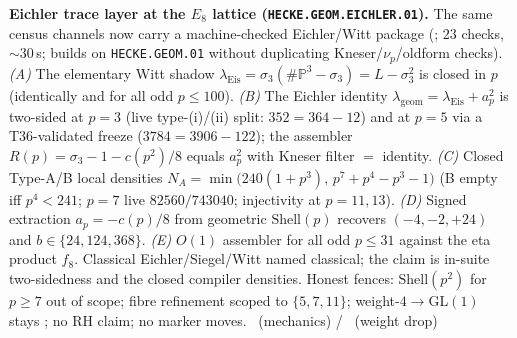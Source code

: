 \documentclass[11pt,a4paper]{article}
\theoremstyle{definition}
\begin{document}
\par\smallskip\noindent\textbf{Eichler trace layer at the $E_8$ lattice
(\texttt{HECKE.GEOM.EICHLER.01}).}
The same census channels now carry a machine-checked Eichler/Witt package
(; $23$ checks, $\sim30$\,s; builds on
\texttt{HECKE.GEOM.01} without duplicating Kneser/$\nu_p$/oldform checks).
\emph{(A)} The elementary Witt shadow
$\lambda_{\mathrm{Eis}}=\sigma_3(\#\mathbb P^3-\sigma_3)=L-\sigma_3^2$ is closed in $p$
(identically and for all odd $p\le100$).
\emph{(B)} The Eichler identity $\lambda_{\mathrm{geom}}=\lambda_{\mathrm{Eis}}+a_p^2$ is
two-sided at $p=3$ (live type-(i)/(ii) split: $352=364-12$) and at $p=5$ via a T36-validated
freeze ($3784=3906-122$); the assembler $R(p)=\sigma_3-1-c(p^2)/8$ equals $a_p^2$ with
Kneser filter $=$ identity.
\emph{(C)} Closed Type-A/B local densities
$N_A=\min\bigl(240(1+p^3),\,p^7+p^4-p^3-1\bigr)$ (B empty iff $p^4<241$; $p=7$ live
$82560/743040$; injectivity at $p=11,13$).
\emph{(D)} Signed extraction $a_p=-c(p)/8$ from geometric $\mathrm{Shell}(p)$ recovers
$(-4,-2,+24)$ and $b\in\{24,124,368\}$.
\emph{(E)} $O(1)$ assembler for all odd $p\le31$ against the eta product $f_8$.
Classical Eichler/Siegel/Witt named classical; the claim is in-suite two-sidedness and the
closed compiler densities. Honest fences: $\mathrm{Shell}(p^2)$ for $p\ge7$ out of scope;
fibre refinement scoped to $\{5,7,11\}$; weight-$4\to$GL$(1)$ stays \mO; no RH claim; no
marker moves. \mE\ (mechanics) / \mO\ (weight drop)
\end{document}

